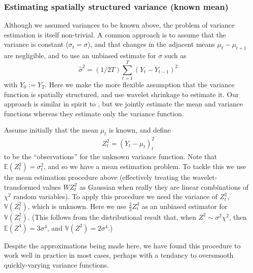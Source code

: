 \documentclass[12pt]{article}
\newcommand{\s}{\sigma}
\begin{document}
\subsubsection{Estimating spatially structured variance (known mean)}

Although we assumed variances to be known above, the problem of variance estimation is itself non-trivial. 
A common approach is to assume that the variance is constant ($\sigma_t=\sigma$), and that changes in the adjacent means $\mu_t-\mu_{t+1}$ are negligible, and to use an unbiased estimate for $\sigma$ such as
\begin{equation} \label{eq:constvar}
\hat{\sigma}^2 = (1/2T) \sum_{t=1}^{T} (Y_t-Y_{t-1})^2
\end{equation}
with $Y_0:=Y_T$.
Here we make the more flexible assumption that the variance function is spatially structured, and use wavelet shrinkage to estimate it. Our approach is similar in spirit to \cite{Cai2008Adaptive}, but we jointly estimate the mean and variance functions whereas they estimate only the variance function.

Assume initially that the mean $\mu_t$ is known, and define
\begin{eqnarray}\label{eq:varobs1}
Z_t^2=(Y_t-\mu_t)^2_t
\end{eqnarray}
to be the ``observations'' for the unknown variance function. Note that $\mathbb{E}(Z_t^2)=\s_t^2$, and so
we have a mean estimation problem. To tackle this we use the mean estimation procedure above (effectively treating the wavelet-transformed values $WZ_t^2$ as Gaussian when really they are linear combinations of $\chi^2$ random variables). To apply this procedure we need the variance
of $Z_t^2$, $\mathbb{V}(Z_t^2)$, which is unknown.
Here we use $\frac{2}{3}Z_t^4$ as an 
unbiased estimator for $\mathbb{V}(Z_t^2)$. (This follows from the distributional result that, when $Z^2 \sim \s^2 \chi^2$, then $\mathbb{E}(Z^4)= 3\s^4$, and $\mathbb{V}(Z^2)=2\s^4$.)

Despite the approximations being made here, we have found this procedure to work well in practice in most cases,
perhaps with a tendancy to oversmooth quickly-varying variance functions. 
\end{document}
